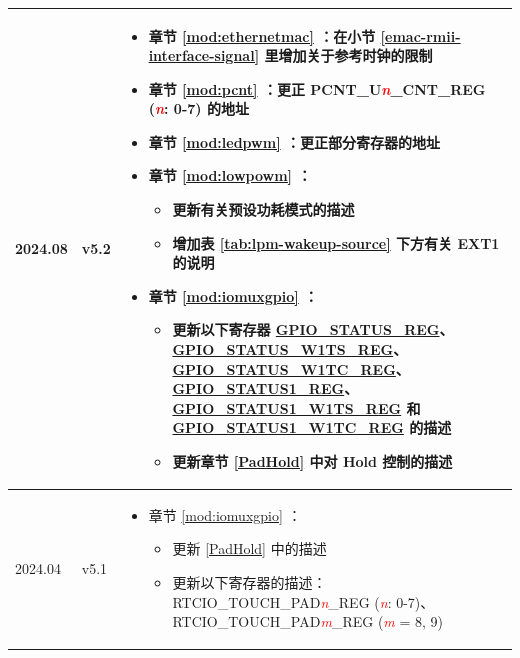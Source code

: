 \begin{longtable}[l]{ | m{2cm} | m{1.5cm} | m{12cm} | }
2024.08 & v5.2 &
\vspace{0.5em}
 \begin{itemize}
    \item 章节 \ref{mod:ethernetmac} \textit{\nameref{mod:ethernetmac}}：在小节 \ref{emac-rmii-interface-signal} 里增加关于参考时钟的限制 %
     \item 章节 \ref{mod:pcnt} \textit{\nameref{mod:pcnt}}：更正 PCNT\_U\textit{\textcolor{red}{\it{n}}}\_CNT\_REG (\textcolor{red}{\it{n}}: 0-7) 的地址 %
     \item 章节 \ref{mod:ledpwm} \textit{\nameref{mod:ledpwm}}：更正部分寄存器的地址 %
     \item 章节 \ref{mod:lowpowm} \textit{\nameref{mod:lowpowm}}：
        \begin{itemize}
            \item 更新有关预设功耗模式的描述 %
            \item 增加表 \ref{tab:lpm-wakeup-source} 下方有关 EXT1 的说明 %
        \end{itemize}
     \item 章节 \ref{mod:iomuxgpio} \textit{\nameref{mod:iomuxgpio}}：
     \begin{itemize}
         \item 更新以下寄存器 \hyperref[regdesc:GPIOSTATUSREG]{GPIO\_STATUS\_REG}、\hyperref[regdesc:GPIOSTATUSW1TSREG]{GPIO\_STATUS\_W1TS\_REG}、\hyperref[regdesc:GPIOSTATUSW1TCREG]{GPIO\_STATUS\_W1TC\_REG}、\hyperref[regdesc:GPIOSTATUS1REG]{GPIO\_STATUS1\_REG}、\hyperref[regdesc:GPIOSTATUS1W1TSREG]{GPIO\_STATUS1\_W1TS\_REG} 和 \hyperref[regdesc:GPIOSTATUS1W1TCREG]{GPIO\_STATUS1\_W1TC\_REG} 的描述 %
         \item 更新章节 \ref{PadHold} 中对 Hold 控制的描述 %
     \end{itemize}
 \end{itemize}
 \vspace{-1em}
\\\hline

2024.04 & v5.1 &
\vspace{0.5em}
\begin{itemize}

    \item 章节 \ref{mod:iomuxgpio} \textit{\nameref{mod:iomuxgpio}}：
    \begin{itemize}
        \item 更新 \ref{PadHold} 中的描述 %
        \item 更新以下寄存器的描述：RTCIO\_TOUCH\_PAD\textcolor{red}{\it{n}}\_REG (\textcolor{red}{\it{n}}: 0-7)、RTCIO\_TOUCH\_PAD\textcolor{red}{\it{m}}\_REG (\textcolor{red}{\it{m}} = 8, 9)
    \end{itemize}


\end{itemize}
\end{longtable}
